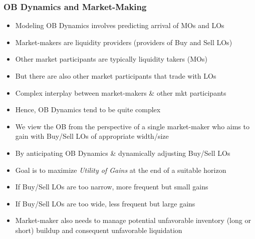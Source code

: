 \documentclass[handout]{beamer}
\begin{document}
\begin{frame}
\frametitle{OB Dynamics and Market-Making}
\pause
\begin{itemize}[<+->]
\item Modeling OB Dynamics involves predicting arrival of MOs and LOs
\item Market-makers are liquidity providers (providers of Buy and Sell LOs)
\item Other market participants are typically liquidity takers (MOs)
\item But there are also other market participants that trade with LOs
\item Complex interplay between market-makers \& other mkt participants
\item Hence, OB Dynamics tend to be quite complex
\item We view the OB from the perspective of a single market-maker who aims to gain with Buy/Sell LOs of appropriate width/size
\item By anticipating OB Dynamics \& dynamically adjusting Buy/Sell LOs
\item Goal is to maximize {\em Utility of Gains} at the end of a suitable horizon
\item If Buy/Sell LOs are too narrow, more frequent but small gains
\item If Buy/Sell LOs are too wide, less frequent but large gains
\item Market-maker also needs to manage potential unfavorable inventory (long or short) buildup and consequent unfavorable liquidation
\end{itemize}
\end{frame}
\end{document}
